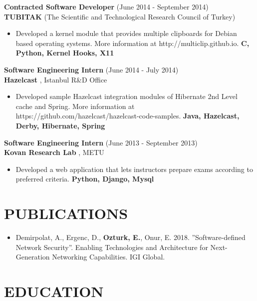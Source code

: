 \documentclass[margin, 10pt]{res} %
\begin{document}
\begin{resume}
        {\bf Contracted Software Developer} \hfill (June 2014 - September 2014) \\
        {\bf TUBITAK }(The Scientific and Technological Research Council of Turkey)
        \begin{itemize}
            \item Developed a kernel module that provides multiple clipboards for Debian based operating systems. More information at http://multiclip.github.io. {\bf C, Python, Kernel Hooks, X11 }
        \end{itemize}

        {\bf Software Engineering Intern} \hfill (June 2014 - July 2014) \\
        {\bf Hazelcast }, Istanbul R\&D Office
        \begin{itemize}
            \item Developed sample Hazelcast integration modules of Hibernate 2nd Level cache and Spring. More information at https://github.com/hazelcast/hazelcast-code-samples. {\bf Java, Hazelcast, Derby, Hibernate, Spring }
        \end{itemize}

        {\bf Software Engineering Intern} \hfill (June 2013 - September 2013) \\
        {\bf Kovan Research Lab }, METU
        \begin{itemize}
            \item Developed a web application that lets instructors prepare exams according to preferred criteria. {\bf Python, Django, Mysql }
        \end{itemize}



        \section{PUBLICATIONS}
        \begin{itemize}
        		\item  Demirpolat, A., Ergenc, D., {\bf Ozturk, E.}, Onur, E. 2018. ”Software-defined Network Security”. Enabling Technologies and Architecture for Next-Generation Networking Capabilities. IGI Global.

        \end{itemize}
        
       \newpage

        \section{EDUCATION}


\end{resume}
\end{document}
